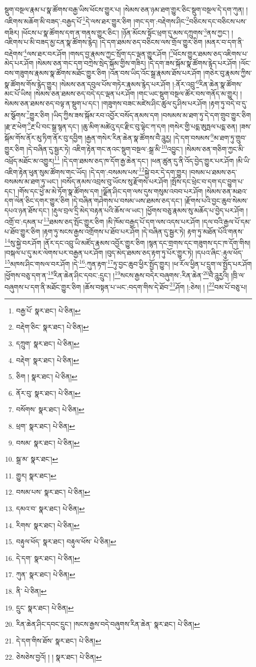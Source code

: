 སྡུག་བསྔལ་རྣམ་པ་སྣ་ཚོགས་བརྒྱ་ཡིས་ཕོངས་གྱུར་པ། །སེམས་ཅན་ཉམ་ཐག་གྱུར་ཅིང་སྡུག་བསྔལ་དེ་དག་ཀུན། །འཇིགས་མཆོག་མི་བཟད་:བརྒྱད་པོ་\footnote{བརྒྱ་པོ་  སྣར་ཐང་།  པེ་ཅིན། }དེ་ལས་ཐར་གྱུར་ཅིག །གང་དག་:བརྡེགས་ཤིང་\footnote{བརྡེག་ཅིང་  སྣར་ཐང་།  པེ་ཅིན། }བཅིངས་དང་བཅིངས་པས་གཟིར། །ཕོངས་པ་སྣ་ཚོགས་དག་ན་གནས་གྱུར་ཅིང་། །ཉོན་མོངས་སྟོང་ཕྲག་དུ་མས་དཀྲུགས་\footnote{དཀྲུག་  སྣར་ཐང་།  པེ་ཅིན། }ནས་ཀྱང་། །འཇིགས་པ་མི་བཟད་མྱ་ངན་སྣ་ཚོགས་རྙེད། །དེ་དག་ཐམས་ཅད་བཅིངས་ལས་གྲོལ་གྱུར་ཅིག །མནར་བ་དག་ནི་བརྡེགས་\footnote{བརྡེག་  སྣར་ཐང་།  པེ་ཅིན། }ལས་ཐར་བར་ཤོག །གསད་བྱ་རྣམས་ཀྱང་སྲོག་དང་ལྡན་གྱུར་ཤོག །\footnote{ཅིག །  སྣར་ཐང་།  པེ་ཅིན། }ཕོངས་གྱུར་ཐམས་ཅད་འཇིགས་པ་མེད་པར་ཤོག །སེམས་ཅན་གང་དག་བཀྲེས་སྲེད་སྐོམ་གྱིས་གཟིར། །དེ་དག་ཟས་སྐོམ་སྣ་ཚོགས་རྙེད་པར་ཤོག །ལོང་བས་གཟུགས་རྣམས་སྣ་ཚོགས་མཐོང་གྱུར་ཅིག །འོན་བས་ཡིད་འོང་སྒྲ་རྣམས་ཐོས་པར་ཤོག །གཅེར་བུ་རྣམས་ཀྱིས་སྣ་ཚོགས་གོས་རྙེད་གྱུར། །སེམས་ཅན་དབུལ་པོས་གཏེར་རྣམས་རྙེད་པར་ཤོག །:ནོར་འབྲུ་\footnote{ནོར་བུ་  སྣར་ཐང་།  པེ་ཅིན། }རིན་ཆེན་སྣ་ཚོགས་མང་པོ་ཡིས། །སེམས་ཅན་ཐམས་ཅད་བདེ་དང་ལྡན་པར་ཤོག །གང་ཡང་སྡུག་བསྔལ་ཚོར་བས་གནོད་མ་གྱུར། །སེམས་ཅན་ཐམས་ཅད་བལྟ་ན་སྡུག་པ་དང་། །གཟུགས་བཟང་མཛེས་ཤིང་ཚུལ་དུ་ཤིས་པར་ཤོག །རྟག་ཏུ་བདེ་བ་དུ་མ་སྩོགས་\footnote{བསོགས་  སྣར་ཐང་།  པེ་ཅིན། }གྱུར་ཅིག །ཡིད་ཀྱིས་ཟས་སྐོམ་རབ་འབྱོར་བསོད་ནམས་དག །བསམས་མ་ཐག་ཏུ་དེ་དག་གྲུབ་གྱུར་ཅིག །རྫ་རྔ་ཕེག་\footnote{ཕྲག་  སྣར་ཐང་།  པེ་ཅིན། }རྔ་པི་བང་སྒྲ་སྙན་དང་། །ཆུ་མིག་མཚེའུ་དང་རྫིང་བུ་ལྟེང་ཀ་དག །གསེར་གྱི་པདྨ་ཨུཏྤལ་པདྨ་ཅན། །ཟས་སྐོམ་གོས་ནོར་མུ་ཏིག་ནོར་བུ་དབྱིག །རྒྱན་གསེར་རིན་ཆེན་སྣ་ཚོགས་བཻ་ཌཱུརྱ། །དེ་དག་བསམས་\footnote{བསམ་  སྣར་ཐང་།  པེ་ཅིན། }མ་ཐག་ཏུ་གྲུབ་གྱུར་ཅིག །དེ་བཞིན་དུ་སྦྱར་ཏེ། འཇིག་རྟེན་གང་ནའང་སྡུག་བསྔལ་:སྒྲ་མི་\footnote{སྒྲ་མ་  སྣར་ཐང་། }འབྱུང་། །སེམས་ཅན་གཅིག་ཀྱང་མི་འཕྲོད་མཐོང་མ་འགྱུར།\footnote{གྱུར།  སྣར་ཐང་། } །དེ་དག་ཐམས་ཅད་ཁ་དོག་རྒྱ་ཆེན་དང་། །ཕན་ཚུན་དུ་ནི་འོད་བྱེད་གྱུར་པར་ཤོག །མི་ཡི་འཇིག་རྟེན་ཕུན་སུམ་ཚོགས་གང་ཡོད། །དེ་དག་:བསམས་པས་\footnote{བསམ་པས་  སྣར་ཐང་།  པེ་ཅིན། }སྐྱེ་བར་དེ་དག་གྱུར། །བསམ་པ་ཐམས་ཅད་བསམས་མ་ཐག་ཏུ་ཡང་། །བསོད་ནམས་འབྲས་བུ་ཡོངས་སུ་རྫོགས་པར་ཤོག །སྤོས་དང་ཕྲེང་བ་དག་དང་བྱུག་པ་དང་། །གོས་དང་ཕྱེ་མ་མེ་ཏོག་སྣ་ཚོགས་དག །ལྗོན་ཤིང་དག་ལས་དུས་གསུམ་འབབ་པར་ཤོག །སེམས་ཅན་མཐའ་དག་ལེན་ཅིང་དགར་གྱུར་ཅིག །དེ་བཞིན་གཤེགས་པ་བསམ་ཡས་ཐམས་ཅད་དང་། །རྫོགས་པའི་བྱང་ཆུབ་སེམས་དཔའ་ཉན་ཐོས་དང་། །རྡུལ་བྲལ་དྲི་མེད་བརྟན་པའི་ཆོས་ལ་ཡང་། །ཕྱོགས་བཅུ་རྣམས་སུ་མཆོད་པ་བྱེད་པར་ཤོག །འགྲོ་བ་:དམན་པ་\footnote{དམའ་བ་  སྣར་ཐང་།  པེ་ཅིན། }ཐམས་ཅད་སྤོང་གྱུར་ཅིག །མི་ཁོམ་བརྒྱད་པོ་དག་ལས་འདས་པར་ཤོག །དལ་བའི་རྒྱལ་པོ་དམ་པ་ཐོབ་གྱུར་ཅིག །རྟག་ཏུ་སངས་རྒྱས་འགྲོགས་པ་ཐོབ་པར་ཤོག །དེ་བཞིན་དུ་སྦྱར་ཏེ། རྟག་ཏུ་མཐོན་པོའི་གནས་\footnote{རིགས་  སྣར་ཐང་།  པེ་ཅིན། }སུ་སྐྱེ་བར་ཤོག །ནོར་དང་འབྲུ་ཡི་མཛོད་རྣམས་འབྱོར་གྱུར་ཅིག །སྙན་དང་གྲགས་དང་གཟུགས་དང་ཁ་དོག་གིས། །བསྐལ་པ་དུ་མར་ལེགས་པར་བརྒྱན་པར་ཤོག །བུད་མེད་ཐམས་ཅད་རྟག་ཏུ་པོར་གྱུར་ཏེ། །དཔའ་ཞིང་:རྟུལ་ཕོད་\footnote{བརྟུལ་ཕོད་  སྣར་ཐང་། བརྟུལ་ཕོས་  པེ་ཅིན། }མཁས་ཤིང་གསལ་བར་ཤོག །དེ་\footnote{དེ་དག་  སྣར་ཐང་།  པེ་ཅིན། }:ཀུན་རྟག་\footnote{ཀུན་  སྣར་ཐང་།  པེ་ཅིན། }ཏུ་བྱང་ཆུབ་ཕྱིར་སྤྱོད་གྱུར། །ཕ་རོལ་ཕྱིན་པ་དྲུག་ལ་སྤྱོད་པར་ཤོག །ཕྱོགས་བཅུ་དག་ན་\footnote{ནི་  པེ་ཅིན། }རིན་ཆེན་ཤིང་དབང་:དྲུང་། །\footnote{དྲུང་  སྣར་ཐང་།  པེ་ཅིན། }སངས་རྒྱས་བདེར་བཞུགས་:རིན་ཆེན་\footnote{རིན་ཆེན་ཤིང་དབང་དྲུང་། །སངས་རྒྱས་བདེ་བཞུགས་རིན་ཆེན་  སྣར་ཐང་།  པེ་ཅིན། }བཻ་ཌཱུརྱའི། །ཁྲི་ལ་བཞུགས་པ་དག་ནི་མཐོང་གྱུར་ཅིག །ཆོས་བསྟན་པ་ཡང་:བདག་གིས་དེ་ཐོབ་\footnote{དེ་དག་གིས་ཐོས་  སྣར་ཐང་།  པེ་ཅིན། }ཤོག །:ཅེས། ། །\footnote{ཅེསཅེས་བྱའོ། ། །  སྣར་ཐང་།  པེ་ཅིན། }བམ་པོ་བཅུ་པ། 